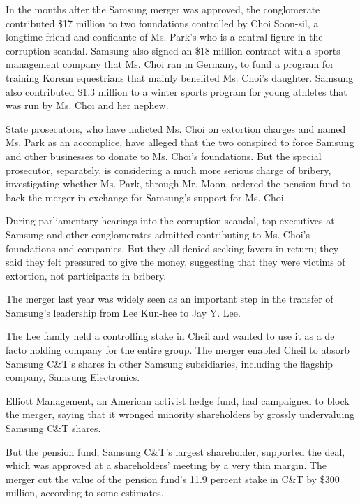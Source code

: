 In the months after the Samsung merger was approved, the conglomerate
contributed \$17 million to two foundations controlled by Choi Soon-sil,
a longtime friend and confidante of Ms. Park's who is a central figure
in the corruption scandal. Samsung also signed an \$18 million contract
with a sports management company that Ms. Choi ran in Germany, to fund a
program for training Korean equestrians that mainly benefited Ms. Choi's
daughter. Samsung also contributed \$1.3 million to a winter sports
program for young athletes that was run by Ms. Choi and her nephew.

State prosecutors, who have indicted Ms. Choi on extortion charges and
\href{http://www.nytimes.com/2016/11/20/world/asia/park-geun-hye-south-korea-extortion-accomplice-prosecutors.html}{named
Ms. Park as an accomplice}, have alleged that the two conspired to force
Samsung and other businesses to donate to Ms. Choi's foundations. But
the special prosecutor, separately, is considering a much more serious
charge of bribery, investigating whether Ms. Park, through Mr. Moon,
ordered the pension fund to back the merger in exchange for Samsung's
support for Ms. Choi.

During parliamentary hearings into the corruption scandal, top
executives at Samsung and other conglomerates admitted contributing to
Ms. Choi's foundations and companies. But they all denied seeking favors
in return; they said they felt pressured to give the money, suggesting
that they were victims of extortion, not participants in bribery.

The merger last year was widely seen as an important step in the
transfer of Samsung's leadership from Lee Kun-hee to Jay Y. Lee.

The Lee family held a controlling stake in Cheil and wanted to use it as
a de facto holding company for the entire group. The merger enabled
Cheil to absorb Samsung C\&T's shares in other Samsung subsidiaries,
including the flagship company, Samsung Electronics.

Elliott Management, an American activist hedge fund, had campaigned to
block the merger, saying that it wronged minority shareholders by
grossly undervaluing Samsung C\&T shares.

But the pension fund, Samsung C\&T's largest shareholder, supported the
deal, which was approved at a shareholders' meeting by a very thin
margin. The merger cut the value of the pension fund's 11.9 percent
stake in C\&T by \$300 million, according to some estimates.

